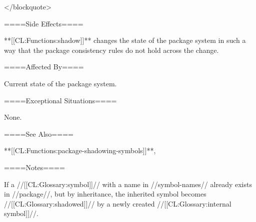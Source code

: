 </blockquote>

====Side Effects====

**[[CL:Functions:shadow]]** changes the state of the package system in such a way that the package consistency rules do not hold across the change.

====Affected By====

Current state of the package system.

====Exceptional Situations====

None.

====See Also====

**[[CL:Functions:package-shadowing-symbols]]**,

{\secref\PackageConcepts}

====Notes====

If a //[[CL:Glossary:symbol]]// with a name in //symbol-names// already exists in //package//, but by inheritance, the inherited symbol becomes //[[CL:Glossary:shadowed]]// by a newly created //[[CL:Glossary:internal symbol]]//.

   
